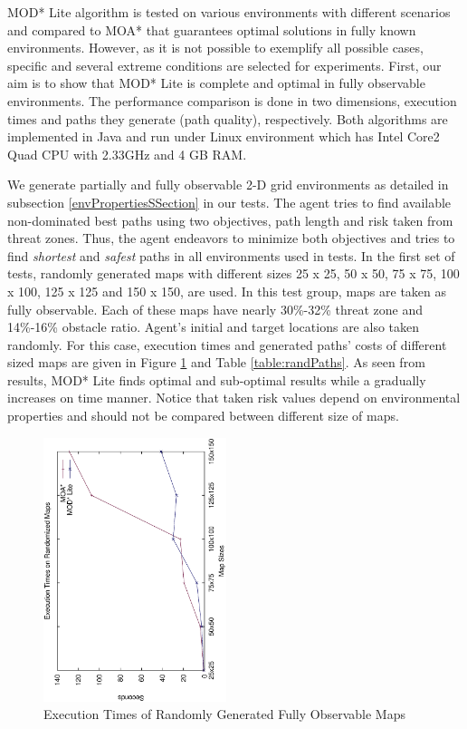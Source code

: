 \documentclass[10pt, a4paper, conference, compsocconf]{IEEEtran}
\begin{document}
MOD* Lite algorithm is tested on various environments with different scenarios and compared to MOA* that guarantees optimal solutions in fully known environments. However, as it is not possible to exemplify all possible cases, specific and several extreme conditions are selected for experiments. First, our aim is to show that MOD* Lite is complete and optimal in fully observable environments. The performance comparison is done in two dimensions, execution times and paths they generate (path quality), respectively. Both algorithms are implemented in Java and run under Linux environment which has Intel Core2 Quad CPU with 2.33GHz and 4 GB RAM.

We generate partially and fully observable 2-D grid environments as detailed in subsection \ref{envPropertiesSSection} in our tests. The agent tries to find available non-dominated best paths using two objectives, path length and risk taken from threat zones. Thus, the agent endeavors to minimize both objectives and tries to find \textit{shortest} and \textit{safest} paths in all environments used in tests. In the first set of tests, randomly generated maps with different sizes  25 x 25, 50 x 50, 75 x 75, 100 x 100, 125 x 125 and 150 x 150, are used. In this test group, maps are taken as fully observable. Each of these maps have nearly 30\%-32\% threat zone and 14\%-16\% obstacle ratio. Agent's initial and target locations are also taken randomly. For this case, execution times and generated paths' costs of different sized maps are given in Figure \ref{fig:rand_fully} and Table \ref{table:randPaths}. As seen from results, MOD* Lite finds optimal and sub-optimal results while a gradually increases on time manner. Notice that taken risk values depend on environmental properties and should not be compared between different size of maps.

\begin{figure}
\centering
\includegraphics[width=2.1in, angle=270]{randomized}
\caption{Execution Times of Randomly Generated Fully Observable Maps}
\label{fig:rand_fully}
\end{figure}
\end{document}
